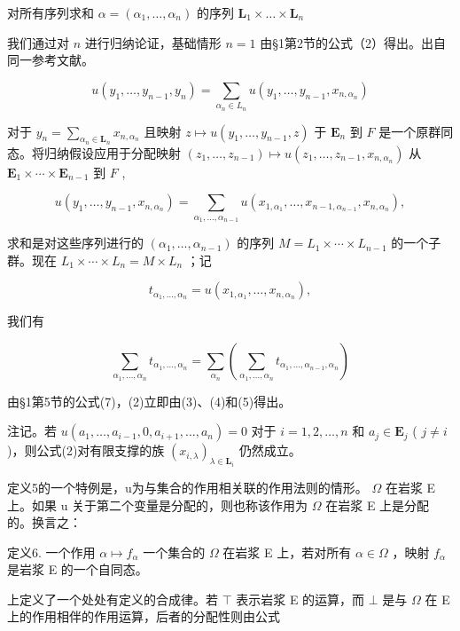 对所有序列求和 \(\alpha = (\alpha_{1},\ldots ,\alpha_{n})\) 的序列 \(\mathbf{L}_1\times \dots \times \mathbf{L}_n\)

我们通过对 \(n\) 进行归纳论证，基础情形 \(n = 1\) 由§1第2节的公式（2）得出。出自同一参考文献。

\[
u (y _ {1}, \dots , y _ {n - 1}, y _ {n}) = \sum_ {\alpha_ {n} \in L _ {n}} u (y _ {1}, \dots , y _ {n - 1}, x _ {n, \alpha_ {n}})\tag{3}
\]

对于 \(y_{n} = \sum_{\alpha_{n} \in \mathbf{L}_{n}} x_{n, \alpha_{n}}\) 且映射 \(z \mapsto u(y_{1}, \ldots, y_{n-1}, z)\) 于 \(\mathbf{E}_{n}\) 到 \(F\) 是一个原群同态。将归纳假设应用于分配映射 \((z_{1}, \ldots, z_{n-1}) \mapsto u(z_{1}, \ldots, z_{n-1}, x_{n, \alpha_{n}})\) 从 \(\mathbf{E}_{1} \times \cdots \times \mathbf{E}_{n-1}\) 到 \(F\) ,

\[
u (y _ {1}, \dots , y _ {n - 1}, x _ {n, \alpha_ {n}}) = \sum_ {\alpha_ {1}, \dots , \alpha_ {n - 1}} u (x _ {1, \alpha_ {1}}, \dots , x _ {n - 1, \alpha_ {n - 1}}, x _ {n, \alpha_ {n}}),\tag{4}
\]

求和是对这些序列进行的 \((\alpha_{1},\ldots,\alpha_{n-1})\) 的序列 \(M=L_{1}\times\cdots\times L_{n-1}\) 的一个子群。现在 \(L_{1}\times\cdots\times L_{n}=M\times L_{n}\) ；记

\[
t _ {\alpha_ {1}, \dots , \alpha_ {n}} = u (x _ {1, \alpha_ {1}}, \dots , x _ {n, \alpha_ {n}}),
\]

我们有

\[
\sum_ {\alpha_ {1}, \dots , \alpha_ {n}} t _ {\alpha_ {1}, \dots , \alpha_ {n}} = \sum_ {\alpha_ {n}} \left(\sum_ {\alpha_ {1}, \dots , \alpha_ {n}} t _ {\alpha_ {1}, \dots , \alpha_ {n - 1}, \alpha_ {n}}\right)\tag{5}
\]

由§1第5节的公式(7)，(2)立即由(3)、(4)和(5)得出。

注记。若 \(u(a_{1},\ldots ,a_{i - 1},0,a_{i + 1},\ldots ,a_{n}) = 0\) 对于 \(i = 1,2,\dots,n\) 和 \(a_{j}\in \mathbf{E}_{j}\) ( \(j\neq i\) )，则公式(2)对有限支撑的族 \((x_{i,\lambda})_{\lambda \in \mathbf{L}_i}\) 仍然成立。

定义5的一个特例是，u为与集合的作用相关联的作用法则的情形。 \(\Omega\) 在岩浆 E 上。如果 u 关于第二个变量是分配的，则也称该作用为 \(\Omega\) 在岩浆 E 上是分配的。换言之：

定义6. 一个作用 \(\alpha \mapsto f_{\alpha}\) 一个集合的 \(\Omega\) 在岩浆 E 上，若对所有 \(\alpha \in \Omega\) ，映射 \(f_{\alpha}\) 是岩浆 E 的一个自同态。

上定义了一个处处有定义的合成律。若 \(\top\) 表示岩浆 E 的运算，而 \(\bot\) 是与 \(\Omega\) 在 E 上的作用相伴的作用运算，后者的分配性则由公式

